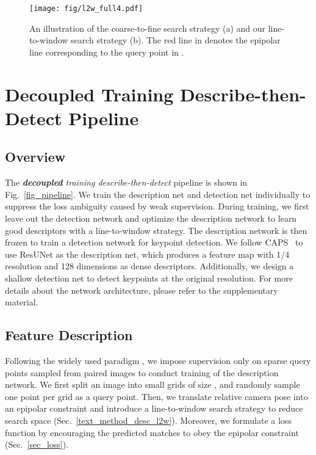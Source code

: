 \documentclass[10pt,twocolumn,letterpaper]{article}
\begin{document}
\begin{figure*}[t]
    \centering
    \texttt{[image: fig/l2w\_full4.pdf]}
    \caption{An illustration of the coarse-to-fine search strategy (a) and our line-to-window search strategy (b). The red line in  denotes the epipolar line corresponding to the query point in .}
    \label{fig_l2w}
\end{figure*}

\section{Decoupled Training Describe-then-Detect Pipeline}

\subsection{Overview}
\label{text_overview}
The \textit{\textbf{decoupled} training describe-then-detect} pipeline is shown in Fig.~\ref{fig_pipeline}. We train the description net and detection net individually to suppress the loss ambiguity caused by weak supervision.  During training, we first leave out the detection network and optimize the description network to learn good descriptors with a line-to-window strategy. The description network is then frozen to train a detection network for keypoint detection. We follow CAPS~\cite{wangLearningFeatureDescriptors2020} to use ResUNet as the description net, which produces a feature map with 1/4 resolution and 128 dimensions as dense descriptors. Additionally, we design a shallow detection net to detect keypoints at the original resolution. For more details about the network architecture, please refer to the supplementary material.


\subsection{Feature Description}
\label{text_method_desc}
Following the widely used paradigm \cite{wangLearningFeatureDescriptors2020}, we impose supervision only on sparse query points sampled from paired images to conduct training of the description network. We first split an image into small grids of size , and randomly sample one point per grid as a query point. Then, we translate
relative camera pose into an epipolar constraint and  introduce a line-to-window search strategy to reduce search space  (Sec.~\ref{text_method_desc_l2w}). 
Moreover, we formulate a loss function by encouraging the predicted matches to obey the epipolar constraint  (Sec.~\ref{sec_loss}).
\end{document}
